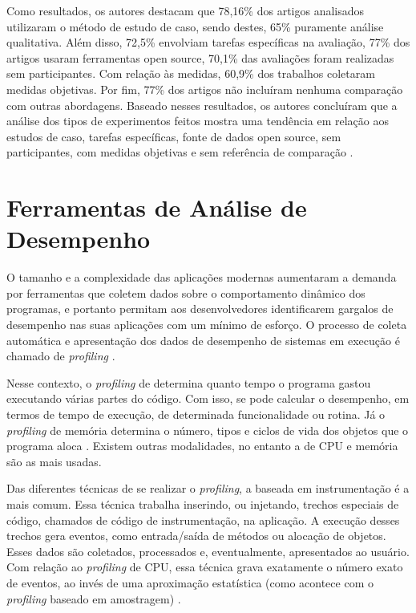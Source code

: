Como resultados, os autores destacam que 78,16\% dos artigos analisados utilizaram o método de estudo de caso, sendo destes, 65\% puramente análise qualitativa. Além disso, 72,5\% envolviam tarefas específicas na avaliação, 77\% dos artigos usaram ferramentas open source, 70,1\% das avaliações foram realizadas sem participantes. Com relação às medidas, 60,9\% dos trabalhos coletaram medidas objetivas. Por fim, 77\% dos artigos não incluíram nenhuma comparação com outras abordagens. Baseado nesses resultados, os autores concluíram que a análise dos tipos de experimentos feitos mostra uma tendência em relação aos estudos de caso, tarefas específicas, fonte de dados open source, sem participantes, com medidas objetivas e sem referência de comparação \cite{Seriai2014}.

\section{Ferramentas de Análise de Desempenho} \label{sec:ferramentas-analise-desempenho}

O tamanho e a complexidade das aplicações modernas aumentaram a demanda por ferramentas que coletem dados sobre o comportamento dinâmico dos programas, e portanto permitam aos desenvolvedores identificarem gargalos de desempenho nas suas aplicações com um mínimo de esforço. O processo de coleta automática e apresentação dos dados de desempenho de sistemas em execução é chamado de \textit{profiling} \cite{Dmitriev2004}.

Nesse contexto, o \textit{profiling} de determina quanto tempo o programa gastou executando várias partes do código. Com isso, se pode calcular o desempenho, em termos de tempo de execução, de determinada funcionalidade ou rotina. Já o \textit{profiling} de memória determina o número, tipos e ciclos de vida dos objetos que o programa aloca \cite{Dmitriev2004}. Existem outras modalidades, no entanto a de CPU e memória são as mais usadas.

Das diferentes técnicas de se realizar o \textit{profiling}, a baseada em instrumentação é a mais comum. Essa técnica trabalha inserindo, ou injetando, trechos especiais de código, chamados de código de instrumentação, na aplicação. A execução desses trechos gera eventos, como entrada/saída de métodos ou alocação de objetos. Esses dados são coletados, processados e, eventualmente, apresentados ao usuário. Com relação ao \textit{profiling} de CPU, essa técnica grava exatamente o número exato de eventos, ao invés de uma aproximação estatística (como acontece com o \textit{profiling} baseado em amostragem) \cite{Dmitriev2004}.


